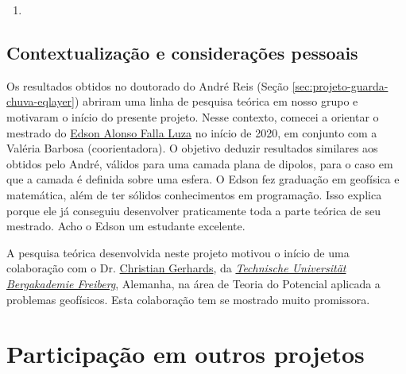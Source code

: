 \begin{enumerate}
	
	\item{}
	
\end{enumerate}

\subsection*{Contextualização e considerações pessoais}

Os resultados obtidos no doutorado do André Reis 
(Seção \ref{sec:projeto-guarda-chuva-eqlayer}) abriram uma linha de pesquisa teórica
em nosso grupo e motivaram o início do presente projeto.
Nesse contexto, comecei a orientar o mestrado do
\href{https://lattes.cnpq.br/4225133150519568}{Edson Alonso Falla Luza} no início
de 2020, em conjunto com a Valéria Barbosa (coorientadora).
O objetivo deduzir resultados similares aos obtidos pelo André, válidos para uma camada 
plana de dipolos, para o caso em que a camada é definida sobre uma esfera.
O Edson fez graduação em geofísica e matemática, além de ter sólidos conhecimentos em 
programação. Isso explica porque ele já conseguiu desenvolver praticamente toda a
parte teórica de seu mestrado. Acho o Edson um estudante excelente.

A pesquisa teórica desenvolvida neste projeto motivou o início de uma colaboração com o 
Dr. \href{https://tu-freiberg.de/en/fakult3/gy/mageo/members}{Christian Gerhards},
da \href{https://tu-freiberg.de/universitaet}{\textsl{Technische Universität Bergakademie Freiberg}}, Alemanha, na área de Teoria do Potencial aplicada a problemas geofísicos.
Esta colaboração tem se mostrado muito promissora.




\section{Participação em outros projetos} 
\label{sec:outros-projeto}

